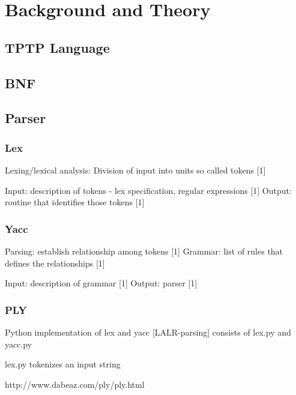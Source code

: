 
\chapter{Background and Theory}\label{cha:Background}

\section{TPTP Language}\label{sec:BackgroundTPTP}

\section{\acf{BNF}}\label{sec:BackgroundBNF}

\section{Parser}\label{sec:BackgroundParser}

\subsection{Lex}\label{sec:Back groundLex}

Lexing/lexical analysis: Division of input into units so called tokens [1]\cite{LexYacc.1992}

Input: description of tokens - lex specification, regular expressions [1]\cite{LexYacc.1992}
Output: routine that identifies those tokens [1]\cite{LexYacc.1992}

\subsection{Yacc}\label{sec:BackgroundYacc}

Parsing: establish relationship among tokens [1]\cite{LexYacc.1992}
Grammar: list of rules that defines the relationships [1]\cite{LexYacc.1992}

Input: description of grammar [1]\cite{LexYacc.1992}
Output: parser [1]\cite{LexYacc.1992}


\subsection{PLY}\label{sec:BackgroundPLY}

Python implementation of lex and yacc
[LALR-parsing]
consists of lex.py and yacc.py

lex.py tokenizes an input string

http://www.dabeaz.com/ply/ply.html